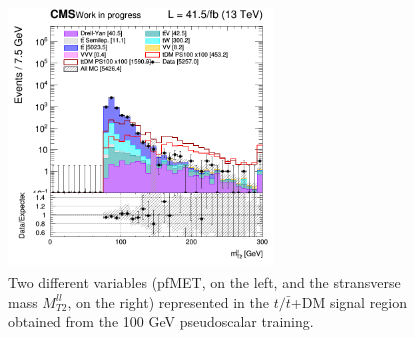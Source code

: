 \documentclass[a4paper, 10pt, openright]{report}
\begin{document}
\begin{figure}[htbp]
{\begin{minipage}[b]{.48\textwidth}
\end{minipage}\hfill
\begin{minipage}[b]{.48\textwidth}
\includegraphics[width=7cm, height=7cm]{figs/2017/SmearSR-ttDM-pseudo100/log_cratio_ST_topCR_ll_BDT_ttDM100_mt2ll.png}
\end{minipage} \hfill
}
\caption{Two different variables (pf\ac{MET}, on the left, and the stransverse mass $M_{T2}^{ll}$, on the right) represented in the $t /\bar t$+DM signal region obtained from the 100 GeV pseudoscalar training.}
\label{fig:SR5}
\end{figure}
\end{document}
